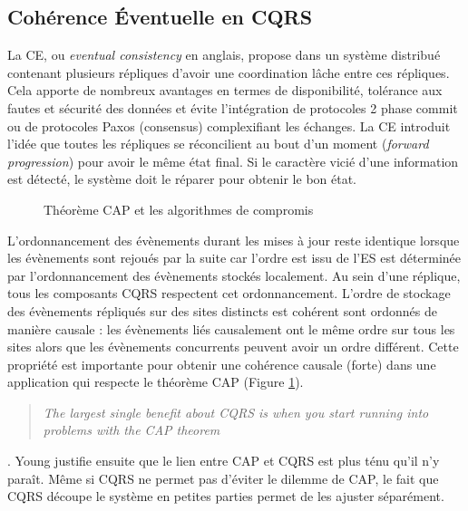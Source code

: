 \subsection{Cohérence Éventuelle en CQRS}


La \gls{CE}, ou \textit{eventual consistency} en anglais, propose dans un système 
distribué contenant plusieurs répliques d'avoir une coordination lâche entre ces 
répliques. Cela apporte de nombreux avantages en termes de disponibilité, 
tolérance aux fautes et sécurité des données et évite l'intégration de protocoles 2 
phase commit ou de protocoles Paxos (consensus) complexifiant les échanges. 
La \gls{CE} introduit l'idée que toutes les répliques se réconcilient au bout d'un 
moment (\textit{forward progression}) pour avoir le même état final. Si le caractère 
vicié d'une information est détecté, le système doit le \og réparer\fg{} pour obtenir 
le bon état. 
\begin{figure} [ht]
	\centering
	\caption{Théorème CAP et les algorithmes de compromis}
	\label{fig:cap}
\end{figure}
L'ordonnancement des évènements durant les mises à jour reste identique lorsque
les évènements sont rejoués par la suite car l'ordre est issu de l'\gls{ES} est 
déterminée par l'ordonnancement des évènements stockés 
localement. Au sein d'une réplique, tous les composants \gls{CQRS} respectent 
cet ordonnancement. L’ordre de stockage des évènements répliqués sur des sites 
distincts est cohérent sont ordonnés de manière causale \cite{Lamport1978} : les 
évènements liés causalement ont le même ordre sur tous les sites alors que les 
évènements concurrents peuvent avoir un ordre différent. Cette propriété est 
importante pour obtenir une cohérence causale (forte) dans une application qui 
respecte le théorème \gls{CAP} (Figure \ref{fig:cap}).  \blockquote[]{	\textit{The 
largest single 
benefit about 
CQRS is when 
		you start running into 
		problems 
		with the CAP theorem}}{
	\cite{Young2010}
}.
Young justifie ensuite que le lien entre \gls{CAP} et \gls{CQRS} est plus ténu qu'il 
n'y paraît. Même si \gls{CQRS} ne permet pas d'éviter le dilemme de \gls{CAP}, le 
fait que \gls{CQRS} découpe le système en petites parties permet de les ajuster 
séparément.

